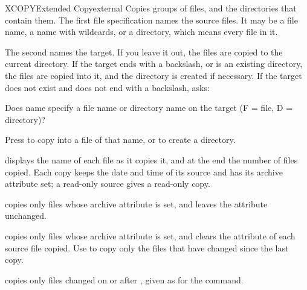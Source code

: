\begin{DosEntry}{XCOPY}{Extended Copy}{external}
\Purpose Copies groups of files, and the directories that contain them.
\Format {}
\Remarks
The first file specification names the source files.  It may be a file
name, a name with wildcards, or a directory, which means every file in it.

The second names the target.  If you leave it out, the files are copied to
the current directory.  If the target ends with a backslash, or is an
existing directory, the files are copied into it, and the directory is
created if necessary.  If the target does not exist and does not end with a
backslash,  asks:
\begin{TypeIn}
Does name specify a file name or directory name on the target
(F = file, D = directory)?
\end{TypeIn}
Press  to copy into a file of that name, or  to create a
directory.

 displays the name of each file as it copies it, and at the end
the number of files copied.  Each copy keeps the date and time of its
source and has its archive attribute set; a read-only source gives a
read-only copy.

 copies only files whose archive attribute is set, and leaves the
attribute unchanged.

 copies only files whose archive attribute is set, and clears the
attribute of each source file copied.  Use  to copy only the files
that have changed since the last copy.

 copies only files changed on or after , given as
for the  command.


\end{DosEntry}

